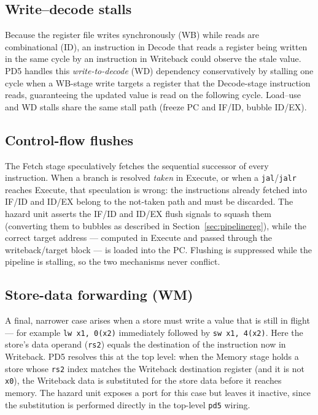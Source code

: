 \documentclass[11pt,a4paper]{article}
\newcommand{\code}[1]{\texttt{#1}}          %
\newcommand{\sig}[1]{\texttt{#1}}
\begin{document}
\subsection{Write--decode stalls}
Because the register file writes synchronously (WB) while reads are combinational (ID), an
instruction in Decode that reads a register being written in the same cycle by an
instruction in Writeback could observe the stale value. PD5 handles this
\emph{write-to-decode} (WD) dependency conservatively by stalling one cycle when a WB-stage
write targets a register that the Decode-stage instruction reads, guaranteeing the updated
value is read on the following cycle. Load--use and WD stalls share the same stall path
(freeze PC and IF/ID, bubble ID/EX).

\subsection{Control-flow flushes}
The Fetch stage speculatively fetches the sequential successor of every instruction. When
a branch is resolved \emph{taken} in Execute, or when a \sig{jal}/\sig{jalr} reaches
Execute, that speculation is wrong: the instructions already fetched into IF/ID and ID/EX
belong to the not-taken path and must be discarded. The hazard unit asserts the IF/ID and
ID/EX flush signals to squash them (converting them to bubbles as described in
Section~\ref{sec:pipelinereg}), while the correct target address --- computed in Execute
and passed through the writeback/target block --- is loaded into the PC. Flushing is
suppressed while the pipeline is stalling, so the two mechanisms never conflict.

\subsection{Store-data forwarding (WM)}
A final, narrower case arises when a store must write a value that is still in flight ---
for example \sig{lw x1, 0(x2)} immediately followed by \sig{sw x1, 4(x2)}. Here the store's
data operand (\sig{rs2}) equals the destination of the instruction now in Writeback. PD5
resolves this at the top level: when the Memory stage holds a store whose \sig{rs2} index
matches the Writeback destination register (and it is not \sig{x0}), the Writeback data is
substituted for the store data before it reaches memory. The hazard unit exposes a port for
this case but leaves it inactive, since the substitution is performed directly in the
top-level \code{pd5} wiring.
\end{document}
